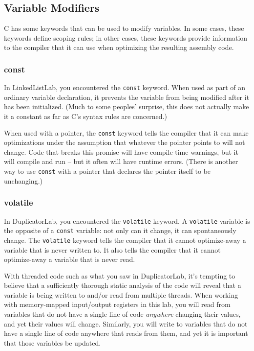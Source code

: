 \subsection{Variable Modifiers}

C has some keywords that can be used to modify variables.
In some cases, these keywords define scoping rules;
in other cases, these keywords provide information to the compiler that it can use when optimizing the resulting assembly code.

\subsubsection{const}

In LinkedListLab, you encountered the \lstinline{const} keyword.
When used as part of an ordinary variable declaration, it prevents the variable from being modified after it has been initialized.
(Much to some peoples' surprise, this does not actually make it a constant as far as C's syntax rules are concerned.)

When used with a pointer, the \lstinline{const} keyword tells the compiler that it can make optimizations under the assumption that whatever the pointer points to will not change.
Code that breaks this promise will have compile-time warnings, but it will compile and run -- but it often will have runtime errors.
(There is another way to use \lstinline{const} with a pointer that declares the pointer itself to be unchanging.)

\subsubsection{volatile}

In DuplicatorLab, you encountered the \lstinline{volatile} keyword.
A \lstinline{volatile} variable is the opposite of a \lstinline{const} variable:
not only can it change, it can spontaneously change.
The \lstinline{volatile} keyword tells the compiler that it cannot optimize-away a variable that is never written to.
It also tells the compiler that it cannot optimize-away a variable that is never read.

With threaded code such as what you saw in DuplicatorLab, it's tempting to believe that a sufficiently thorough static analysis of the code will reveal that a variable is being written to and/or read from multiple threads.
When working with memory-mapped input/output registers in this lab, you will read from variables that do not have a single line of code \textit{anywhere} changing their values, and yet their values will change.
Similarly, you will write to variables that do not have a single line of code anywhere that reads from them, and yet it is important that those variables be updated.

